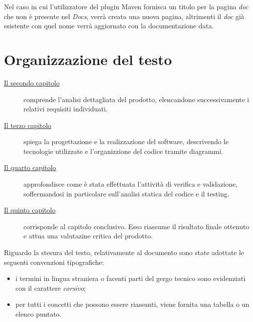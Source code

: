 Nel caso in cui l'utilizzatore del plugin Maven fornisca un titolo per la pagina \emph{doc} che non è presente nel \emph{Docs}, verrà creata una nuova pagina, altrimenti il \emph{doc} già esistente con quel nome verrà aggiornato con la documentazione data.

\section{Organizzazione del testo}

\begin{description}
    \item[{\hyperref[cap:analisi-requisiti]{Il secondo capitolo}}] comprende l'analisi dettagliata del prodotto, elencandone successivamente i relativi requisiti individuati.

    \item[{\hyperref[cap:progettazione]{Il terzo capitolo}}] spiega la progettazione e la realizzazione del software, descrivendo le tecnologie utilizzate e l'organizzione del codice tramite diagrammi.

    \item[{\hyperref[cap:testing]{Il quarto capitolo}}] approfondisce come è stata effettuata l'attività di verifica e validazione, soffermandosi in particolare sull'analisi statica del codice e il testing.

    \item[{\hyperref[cap:conclusioni]{Il quinto capitolo}}] corrisponde al capitolo conclusivo. Esso riassume il risultato finale ottenuto e attua una valutazine critica del prodotto.

\end{description}

Riguardo la stesura del testo, relativamente al documento sono state adottate le seguenti convenzioni tipografiche:
\begin{itemize}
	\item i termini in lingua straniera o facenti parti del gergo tecnico sono evidenziati con il carattere \emph{corsivo};
	\item per tutti i concetti che possono essere riassunti, viene fornita una tabella o un elenco puntato.
\end{itemize}